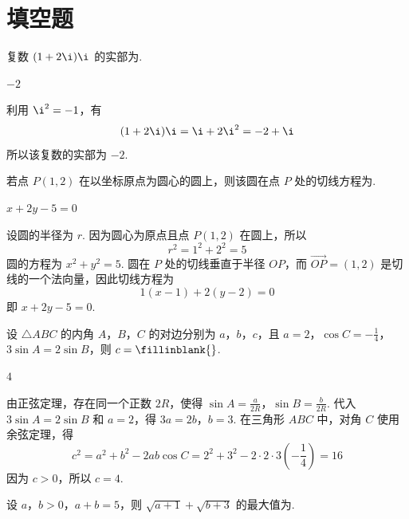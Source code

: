 \section{填空题}

\begin{problem}
复数 \((1 + 2\i)\i\) 的实部为\fillinblank{}.
\end{problem}

\begin{answer}
\(-2\)
\end{answer}

\begin{solution}
利用 \(\i^{2}=-1\)，有
\[
(1+2\i)\i=\i+2\i^{2}=-2+\i
\]
所以该复数的实部为 \(-2\).
\end{solution}

\begin{problem}
若点 \(P(1,2)\) 在以坐标原点为圆心的圆上，则该圆在点 \(P\) 处的切线方程为\fillinblank{}.
\end{problem}

\begin{answer}
\(x+2y-5=0\)
\end{answer}

\begin{solution}
设圆的半径为 \(r\). 因为圆心为原点且点 \(P(1,2)\) 在圆上，所以
\[
r^{2}=1^{2}+2^{2}=5
\]
圆的方程为 \(x^{2}+y^{2}=5\). 圆在 \(P\) 处的切线垂直于半径 \(OP\)，而 \(\overrightarrow{OP}=(1,2)\) 是切线的一个法向量，因此切线方程为
\[
1(x-1)+2(y-2)=0
\]
即 \(x+2y-5=0\).
\end{solution}

\begin{problem}
设 \(\triangle ABC\) 的内角 \(A\)，\(B\)，\(C\) 的对边分别为 \(a\)，\(b\)，\(c\)，且 \(a = 2\)，\(\cos C = -\frac{1}{4}\)，\(3\sin A = 2\sin B\)，则 \(c =\fillinblank{}\).
\end{problem}

\begin{answer}
\(4\)
\end{answer}

\begin{solution}
由正弦定理，存在同一个正数 \(2R\)，使得
\(\sin A=\frac{a}{2R}\)，\(\sin B=\frac{b}{2R}\).
代入 \(3\sin A=2\sin B\) 和 \(a=2\)，得
\(3a=2b\)，\(b=3\).
在三角形 \(ABC\) 中，对角 \(C\) 使用余弦定理，得
\[
c^{2}=a^{2}+b^{2}-2ab\cos C
=2^{2}+3^{2}-2\cdot2\cdot3\left(-\frac14\right)=16
\]
因为 \(c>0\)，所以 \(c=4\).
\end{solution}

\begin{problem}
设 \(a\)，\(b > 0\)，\(a + b = 5\)，则 \(\sqrt{a + 1} + \sqrt{b + 3}\) 的最大值为\fillinblank{}.
\end{problem}

